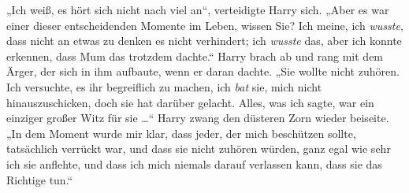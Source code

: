 „Ich weiß, es hört sich nicht nach viel an“, verteidigte Harry sich.
„Aber es war einer dieser entscheidenden Momente im Leben, wissen Sie? Ich meine, ich \emph{wusste}, dass nicht an etwas zu denken es nicht verhindert; ich \emph{wusste} das, aber ich konnte erkennen, dass Mum das trotzdem dachte.“ Harry brach ab und rang mit dem Ärger, der sich in ihm aufbaute, wenn er daran dachte.
„Sie wollte nicht zuhören. Ich versuchte, es ihr begreiflich zu machen, ich \emph{bat} sie, mich nicht hinauszuschicken, doch sie hat darüber gelacht. Alles, was ich sagte, war ein einziger großer Witz für sie …“ Harry zwang den düsteren Zorn wieder beiseite.
„In dem Moment wurde mir klar, dass jeder, der mich beschützen sollte, tatsächlich verrückt war, und dass sie nicht zuhören würden, ganz egal wie sehr ich sie anflehte, und dass ich mich niemals darauf verlassen kann, dass sie das Richtige tun.“

